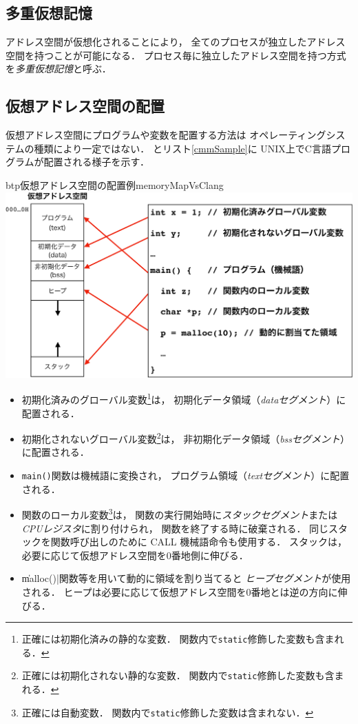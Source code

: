 \subsection{多重仮想記憶}
アドレス空間が仮想化されることにより，
全てのプロセスが独立したアドレス空間を持つことが可能になる．
プロセス毎に独立したアドレス空間を持つ方式を\emph{多重仮想記憶}と呼ぶ．

\subsection{仮想アドレス空間の配置}
仮想アドレス空間にプログラムや変数を配置する方法は
オペレーティングシステムの種類により一定ではない．
とリスト\ref{cmmSample}に
UNIX上でC言語プログラムが配置される様子を示す．

\begin{myfig}{btp}{仮想アドレス空間の配置例}{memoryMapVsClang}
  \includegraphics[scale=0.6]{Fig/memoryMapVsClang-crop.pdf}
\end{myfig}

\begin{itemize}
\item 初期化済みのグローバル変数\footnote{
  正確には初期化済みの静的な変数．
  関数内で\texttt{static}修飾した変数も含まれる．}は，
  初期化データ領域（\emph{dataセグメント}）に配置される．
\item 初期化されないグローバル変数\footnote{
  正確には初期化されない静的な変数．
  関数内で\texttt{static}修飾した変数も含まれる．}は，
  非初期化データ領域（\emph{bssセグメント}）に配置される．
\item \texttt{main()}関数は機械語に変換され，
  プログラム領域（\emph{textセグメント}）に配置される．
\item 関数のローカル変数\footnote{
  正確には自動変数．
  関数内で\texttt{static}修飾した変数は含まれない．}は，
  関数の実行開始時に\emph{スタックセグメント}または
  \emph{CPUレジスタ}に割り付けられ，
  関数を終了する時に破棄される．
  同じスタックを関数呼び出しのために CALL 機械語命令も使用する．
  スタックは，必要に応じて仮想アドレス空間を0番地側に伸びる．
\item \|malloc()|関数等を用いて動的に領域を割り当てると
  \emph{ヒープセグメント}が使用される．
  ヒープは必要に応じて仮想アドレス空間を0番地とは逆の方向に伸びる．
\end{itemize}

